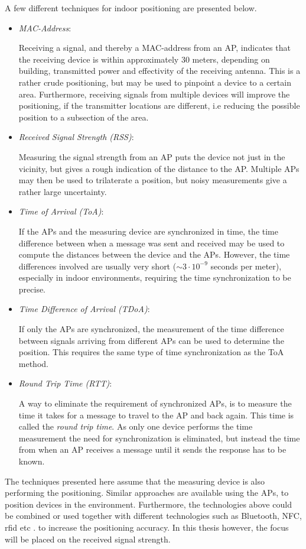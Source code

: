 \documentclass{LTHthesis}
\begin{document}
A few different techniques for indoor positioning are presented below.
%
\begin{itemize}
\item \emph{MAC-Address}:  

Receiving a signal, and thereby a MAC-address from an AP, indicates that the receiving device is within approximately $30$ meters, depending on building, transmitted power and effectivity of the receiving antenna. This is a rather crude positioning, but may be used to pinpoint a device to a certain area. Furthermore, receiving signals from multiple devices will improve the positioning, if the transmitter locations are different, i.e reducing the possible position to a subsection of the area. 
%
\item \emph{Received Signal Strength (RSS)}:

Measuring the signal strength from an AP puts the device not just in the vicinity, but gives a rough indication of the distance to the AP. Multiple APs may then be used to trilaterate a position, but noisy measurements give a rather large uncertainty. 
%
\item \emph{Time of Arrival (ToA)}:

If the APs and the measuring device are synchronized in time, the time difference between when a message was sent and received may be used to compute the distances between the device and the APs. However, the time differences involved are usually very short ($\sim 3\cdot10^{-9}$ seconds per meter), especially in indoor environments, requiring the time synchronization to be precise.  
%
\item \emph{Time Difference of Arrival (TDoA)}:

If only the APs are synchronized, the measurement of the time difference between signals arriving from different APs can be used to determine the position. This requires the same type of time synchronization as the ToA method. 

\item \emph{Round Trip Time (RTT)}: 

A way to eliminate the requirement of synchronized APs, is to measure the time it takes for a message to travel to the AP and back again. This time is called the \emph{round trip time}. As only one device performs the time measurement the need for synchronization is eliminated, but instead the time from when an AP receives a message until it sends the response has to be known.
%
\end{itemize}
%
The techniques presented here assume that the measuring device is also performing the positioning. Similar approaches are available using the APs, to position devices in the environment. Furthermore, the technologies above could be combined or used together with different technologies such as Bluetooth, NFC, rfid etc \cite{nfc, rfid}. to increase the positioning accuracy. 
In this thesis however, the focus will be placed on the received signal strength.
%
\end{document}
